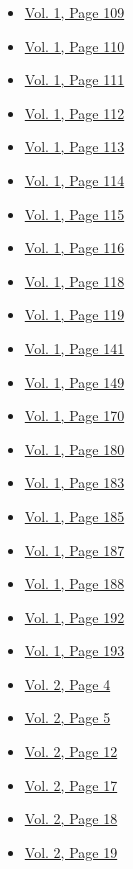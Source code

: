 \begin{itemize}
\begin{itemize}
  \item
    \protect\hyperlink{g-page-117}{Vol. 1, Page 109}
  \item
    \protect\hyperlink{g-page-118}{Vol. 1, Page 110}
  \item
    \protect\hyperlink{g-page-119}{Vol. 1, Page 111}
  \item
    \protect\hyperlink{g-page-120}{Vol. 1, Page 112}
  \item
    \protect\hyperlink{g-page-121}{Vol. 1, Page 113}
  \item
    \protect\hyperlink{g-page-122}{Vol. 1, Page 114}
  \item
    \protect\hyperlink{g-page-123}{Vol. 1, Page 115}
  \item
    \protect\hyperlink{g-page-124}{Vol. 1, Page 116}
  \item
    \protect\hyperlink{g-page-126}{Vol. 1, Page 118}
  \item
    \protect\hyperlink{g-page-127}{Vol. 1, Page 119}
  \item
    \protect\hyperlink{g-page-149}{Vol. 1, Page 141}
  \item
    \protect\hyperlink{g-page-157}{Vol. 1, Page 149}
  \item
    \protect\hyperlink{g-page-178}{Vol. 1, Page 170}
  \item
    \protect\hyperlink{g-page-188}{Vol. 1, Page 180}
  \item
    \protect\hyperlink{g-page-191}{Vol. 1, Page 183}
  \item
    \protect\hyperlink{g-page-193}{Vol. 1, Page 185}
  \item
    \protect\hyperlink{g-page-195}{Vol. 1, Page 187}
  \item
    \protect\hyperlink{g-page-196}{Vol. 1, Page 188}
  \item
    \protect\hyperlink{g-page-200}{Vol. 1, Page 192}
  \item
    \protect\hyperlink{g-page-201}{Vol. 1, Page 193}
  \item
    \protect\hyperlink{g-page-216}{Vol. 2, Page 4}
  \item
    \protect\hyperlink{g-page-217}{Vol. 2, Page 5}
  \item
    \protect\hyperlink{g-page-224}{Vol. 2, Page 12}
  \item
    \protect\hyperlink{g-page-229}{Vol. 2, Page 17}
  \item
    \protect\hyperlink{g-page-230}{Vol. 2, Page 18}
  \item
    \protect\hyperlink{g-page-231}{Vol. 2, Page 19}

\end{itemize}
\end{itemize}
